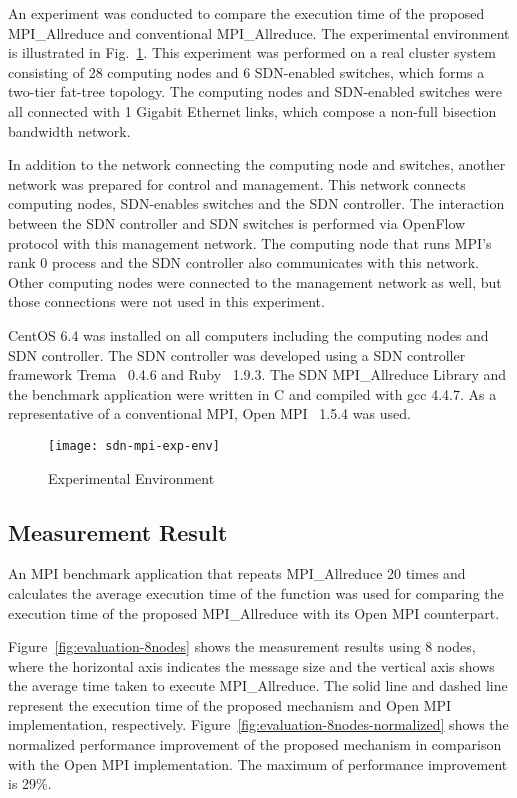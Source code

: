 An experiment was conducted to compare the execution time of the
proposed MPI\_Allreduce and conventional
MPI\_Allreduce. The experimental environment is illustrated in
Fig.~\ref{fig:experiment-environment}. This experiment was performed on
a real cluster system consisting of 28 computing nodes and 6 SDN-enabled
switches, which forms a two-tier fat-tree topology. The computing nodes
and SDN-enabled switches were all connected with 1 Gigabit Ethernet
links, which compose a non-full bisection bandwidth network.

In addition to the network connecting the computing node and switches,
another network was prepared for control and management. This network
connects computing nodes, SDN-enables switches and the SDN controller.
The interaction between the SDN controller and SDN switches is performed
via OpenFlow protocol with this management network. The computing node
that runs MPI's rank 0 process and the SDN controller also communicates
with this network. Other computing nodes were connected to the
management network as well, but those connections were not used in this
experiment.

CentOS 6.4 was installed on all computers including the computing nodes and
SDN controller. The SDN controller was developed using a SDN controller
framework Trema~\autocite{trema} 0.4.6 and Ruby~\autocite{ruby} 1.9.3. The SDN
MPI\_Allreduce Library and the benchmark application were written in C and
compiled with gcc 4.4.7. As a representative of a conventional MPI,
Open MPI~\autocite{Gabriel2004} 1.5.4 was used.

\begin{figure}
    \centering
    \texttt{[image: sdn-mpi-exp-env]}
    \caption{Experimental Environment}%
    \label{fig:experiment-environment}
\end{figure}

\subsection{Measurement Result}

An MPI benchmark application that repeats MPI\_Allreduce 20
times and calculates the average execution time of the function was used
for comparing the execution time of the proposed MPI\_Allreduce
with its Open MPI counterpart.

Figure~\ref{fig:evaluation-8nodes} shows the measurement results using 8
nodes, where the horizontal axis indicates the message size and the
vertical axis shows the average time taken to execute
MPI\_Allreduce. The solid line and dashed line represent the
execution time of the proposed mechanism and Open MPI implementation,
respectively. Figure~\ref{fig:evaluation-8nodes-normalized} shows the
normalized performance improvement of the proposed mechanism in
comparison with the Open MPI implementation. The maximum of performance
improvement is 29\%.

